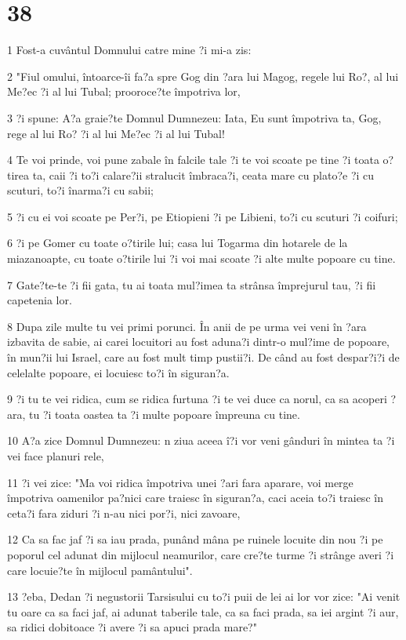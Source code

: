 \chapter{38}

\par 1 Fost-a cuvântul Domnului catre mine ?i mi-a zis:
\par 2 "Fiul omului, întoarce-îi fa?a spre Gog din ?ara lui Magog, regele lui Ro?, al lui Me?ec ?i al lui Tubal; prooroce?te împotriva lor,
\par 3 ?i spune: A?a graie?te Domnul Dumnezeu: Iata, Eu sunt împotriva ta, Gog, rege al lui Ro? ?i al lui Me?ec ?i al lui Tubal!
\par 4 Te voi prinde, voi pune zabale în falcile tale ?i te voi scoate pe tine ?i toata o?tirea ta, caii ?i to?i calare?ii stralucit îmbraca?i, ceata mare cu plato?e ?i cu scuturi, to?i înarma?i cu sabii;
\par 5 ?i cu ei voi scoate pe Per?i, pe Etiopieni ?i pe Libieni, to?i cu scuturi ?i coifuri;
\par 6 ?i pe Gomer cu toate o?tirile lui; casa lui Togarma din hotarele de la miazanoapte, cu toate o?tirile lui ?i voi mai scoate ?i alte multe popoare cu tine.
\par 7 Gate?te-te ?i fii gata, tu ai toata mul?imea ta strânsa împrejurul tau, ?i fii capetenia lor.
\par 8 Dupa zile multe tu vei primi porunci. În anii de pe urma vei veni în ?ara izbavita de sabie, ai carei locuitori au fost aduna?i dintr-o mul?ime de popoare, în mun?ii lui Israel, care au fost mult timp pustii?i. De când au fost despar?i?i de celelalte popoare, ei locuiesc to?i în siguran?a.
\par 9 ?i tu te vei ridica, cum se ridica furtuna ?i te vei duce ca norul, ca sa acoperi ?ara, tu ?i toata oastea ta ?i multe popoare împreuna cu tine.
\par 10 A?a zice Domnul Dumnezeu: n ziua aceea î?i vor veni gânduri în mintea ta ?i vei face planuri rele,
\par 11 ?i vei zice: "Ma voi ridica împotriva unei ?ari fara aparare, voi merge împotriva oamenilor pa?nici care traiesc în siguran?a, caci aceia to?i traiesc în ceta?i fara ziduri ?i n-au nici por?i, nici zavoare,
\par 12 Ca sa fac jaf ?i sa iau prada, punând mâna pe ruinele locuite din nou ?i pe poporul cel adunat din mijlocul neamurilor, care cre?te turme ?i strânge averi ?i care locuie?te în mijlocul pamântului".
\par 13 ?eba, Dedan ?i negustorii Tarsisului cu to?i puii de lei ai lor vor zice: "Ai venit tu oare ca sa faci jaf, ai adunat taberile tale, ca sa faci prada, sa iei argint ?i aur, sa ridici dobitoace ?i avere ?i sa apuci prada mare?"
